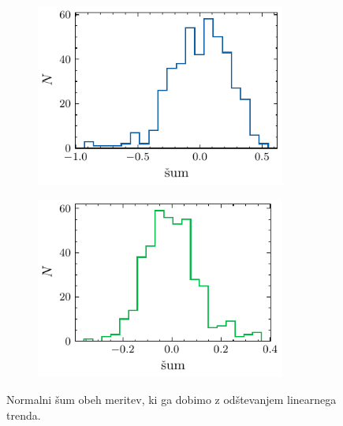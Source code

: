 \documentclass[11pt, oneside]{article}
\theoremstyle{definition}
\begin{document}
\begin{figure}[h!]
    \centering
    \begin{subfigure}[b]{0.49\textwidth}
        \centering
        \includegraphics[width=0.9\textwidth]{mioni_sum_0.pdf}
        \label{fig: mu_noise1}
    \end{subfigure}
    \hfill
    \begin{subfigure}[b]{0.49\textwidth}
        \centering
        \includegraphics[width=0.9\textwidth]{mioni_sum_1.pdf}
        \label{fig:mu_noise2}
    \end{subfigure}
    \caption{Normalni šum obeh meritev, ki ga dobimo z odštevanjem linearnega trenda.}
    \label{fig: mu_noise}
\end{figure}
\end{document}
